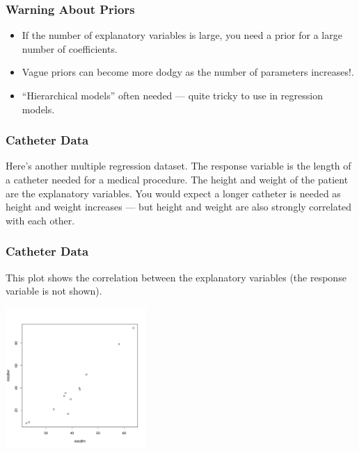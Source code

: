 \documentclass{beamer}
\begin{document}
\begin{frame}
\frametitle{Warning About Priors}
\begin{itemize}
\item If the number of explanatory variables is large, you need a prior
for a large number of coefficients.\pause
\item Vague priors can become more dodgy as the number of
parameters increases!.\pause
\item ``Hierarchical models'' often needed --- quite tricky to use in
regression models.
\end{itemize}

\end{frame}


\begin{frame}
\frametitle{Catheter Data}
Here's another multiple regression dataset.
The response variable is the length of a catheter needed for a medical procedure.
The height and weight of the patient are the explanatory variables.
You would expect a longer catheter is needed as height and weight increases
--- but height and weight are also strongly correlated with each other.

\end{frame}

\begin{frame}
\frametitle{Catheter Data}
This plot shows the correlation between the explanatory variables
(the response variable is not shown).

\begin{center}
\includegraphics[width=0.4\textwidth]{images/catheter.pdf}
\end{center}

\end{frame}
\end{document}
